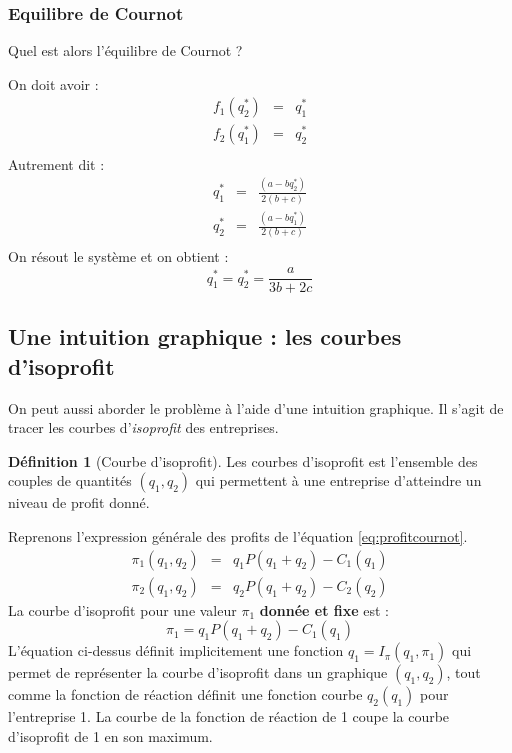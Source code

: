 \documentclass[
]{book}
\theoremstyle{definition}
\newtheorem{definition}{Définition}[chapter]
\theoremstyle{definition}
\theoremstyle{definition}
\theoremstyle{definition}
\theoremstyle{remark}
\begin{document}
\hypertarget{equilibre-de-cournot}{%
\subsubsection{Equilibre de Cournot}\label{equilibre-de-cournot}}

Quel est alors l'équilibre de Cournot ?

On doit avoir :
\[
\begin{array}{rcl}
f_1(q_2^*) &=& q_1^*\\
f_2(q_1^*) &=& q_2^*\\
\end{array}
\]
Autrement dit :
\[
\begin{array}{rcl}
q_1^* &=& \frac{(a-bq_2^*)}{2(b+c)} \\
q_2^* &=&\frac{(a-bq_1^*)}{2(b+c)}\\
\end{array}
\]
On résout le système et on obtient :
\[
q_1^*=q_2^* = \frac{a}{3b+2c}
\]

\hypertarget{une-intuition-graphique-les-courbes-disoprofit}{%
\subsection{Une intuition graphique : les courbes d'isoprofit}\label{une-intuition-graphique-les-courbes-disoprofit}}

On peut aussi aborder le problème à l'aide d'une intuition graphique.
Il s'agit de tracer les courbes d'\emph{isoprofit} des entreprises.

\begin{definition}[Courbe d'isoprofit]
Les courbes d'isoprofit est l'ensemble des couples de quantités \((q_1, q_2)\) qui permettent à une entreprise d'atteindre un niveau de profit donné.
\end{definition}

Reprenons l'expression générale des profits de l'équation \eqref{eq:profitcournot}.
\[
\begin{array}{rcl}
\pi_1(q_1, q_2) &=& q_1P(q_1+q_2)-C_1(q_1)\\
\pi_2(q_1, q_2) &=& q_2P(q_1+q_2) -C_2(q_2)
\end{array}
\]
La courbe d'isoprofit pour une valeur \(\pi_1\) \textbf{donnée et fixe} est :
\[
\pi_1 = q_1P(q_1+q_2)-C_1(q_1)
\]
L'équation ci-dessus définit implicitement une fonction \(q_1=I_\pi(q_1, \pi_1)\) qui permet de représenter la courbe d'isoprofit dans un graphique \((q_1,q_2)\), tout comme la fonction de réaction définit une fonction courbe \(q_2(q_1)\) pour l'entreprise 1.
La courbe de la fonction de réaction de 1 coupe la courbe d'isoprofit de 1 en son maximum.
\end{document}
